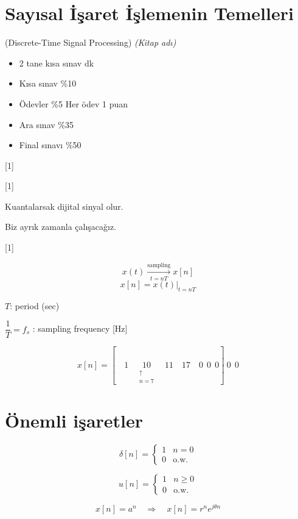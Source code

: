 \documentclass[11pt,a4paper]{article}
\begin{document}

\section{Sayısal İşaret İşlemenin Temelleri}
(Discrete-Time Signal Processing) \textit{(Kitap adı)}

\begin{itemize}
  \item 2 tane kısa sınav  dk
  \item Kısa sınav \%10
  \item Ödevler \%5 \quad Her ödev 1 puan
  \item Ara sınav \%35
  \item Final sınavı \%50
\end{itemize}

[1]

[1]

Kuantalarsak dijital sinyal olur.

Biz ayrık zamanla çalışacağız.

[1]

\[ x(t) \xrightarrow[t=nT]{\text{sampling}} x[n] \]
\[ x[n] = x(t)\Big|_{t=nT} \]

$T$: period (sec)

$\dfrac{1}{T} = f_s$ : sampling frequency [Hz]

\[ x[n] = [\quad 1 \quad \underset{\substack{\uparrow\\ n=7}}{10} \quad 11 \quad 17 \quad 0\ \ 0\ \ 0]\ 0\ \ 0 \]

\section{Önemli işaretler}

\[ \delta[n] = \begin{cases} 1 & n=0 \\ 0 & \text{o.w.} \end{cases} \]

\[ u[n] = \begin{cases} 1 & n \ge 0 \\ 0 & \text{o.w.} \end{cases} \]

\[ x[n] = a^n \quad \Longrightarrow \quad x[n] = r^n e^{j\theta n} \]
\end{document}
